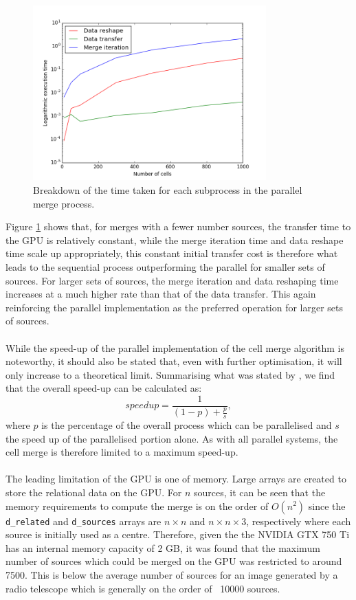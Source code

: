 \begin{figure}[H]
\centering
\includegraphics[width=0.8\textwidth]{Images/result_profile.png}
\caption{Breakdown of the time taken for each subprocess in the parallel merge process.}
\label{res:fig:prof}
\end{figure}
Figure \ref{res:fig:prof} shows that, for merges with a fewer number sources, the transfer time to the GPU is relatively constant, while the merge iteration time and data reshape time scale up appropriately, this constant initial transfer cost is therefore what leads to the sequential process outperforming the parallel for smaller sets of sources. For larger sets of sources, the merge iteration and data reshaping time increases at a much higher rate than that of the data transfer.  This again reinforcing the parallel implementation as the preferred operation for larger sets of sources.
\\
\\
While the speed-up of the parallel implementation of the cell merge algorithm is noteworthy, it should also be stated that, even with further optimisation, it will only increase to a theoretical limit. Summarising what was stated by \citep{amdahl1967validity}, we find that the overall speed-up can be calculated as:
\begin{equation}
	speedup = \frac{1}{(1-p)+\frac{p}{s}},
\end{equation}
where $p$ is the percentage of the overall process which can be parallelised and $s$ the speed up of the parallelised portion alone. As with all parallel systems, the cell merge is therefore limited to a maximum speed-up.
\\
\\
The leading limitation of the GPU is one of memory. Large arrays are created to store the relational data on the GPU. For $n$ sources, it can be seen that the memory requirements to compute the merge is on the order of $O(n^2)$ since the \texttt{d\_related} and \texttt{d\_sources} arrays are $n \times n$ and $n \times n \times 3$, respectively where each source is initially used as a centre. Therefore, given the the NVIDIA GTX 750 Ti has an internal memory capacity of 2 GB, it was found that the maximum number of sources which could be merged on the GPU was restricted to around 7500. This is below the average number of sources for an image generated by a radio telescope which is generally on the order of ~10000 sources.